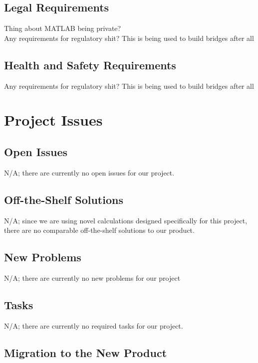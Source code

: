 \documentclass[12pt]{article}
\begin{document}
\subsection{Legal Requirements}

Thing about MATLAB being private?\\

Any requirements for regulatory shit? This is being used to build bridges after all\\

\subsection{Health and Safety Requirements}

Any requirements for regulatory shit? This is being used to build bridges after all\\

\section{Project Issues}

\subsection{Open Issues}

N/A; there are currently no open issues for our project.

\subsection{Off-the-Shelf Solutions}

N/A; since we are using novel calculations designed specifically for this project, there are no comparable off-the-shelf solutions to our product.

\subsection{New Problems}

N/A; there are currently no new problems for our project

\subsection{Tasks}

N/A; there are currently no required tasks for our project.

\subsection{Migration to the New Product}
\end{document}
